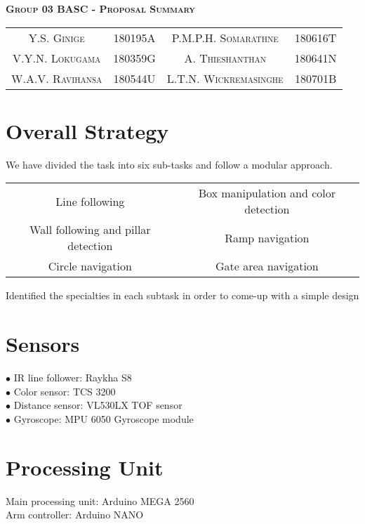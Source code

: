 \documentclass[a4paper, 12pt]{article}
\begin{document}
\begin{center}
     \textbf{\textsc{\Large {Group 03 BASC - Proposal Summary\\}}}
\end{center}

\begin{center}
\begin{tabular}{c c c c}
     \textsc{Y.S. Ginige} & 180195A &  \textsc{P.M.P.H. Somarathne} & 180616T\\
     \textsc{V.Y.N. Lokugama }& 180359G & \textsc{A. Thieshanthan} &  180641N\\
       \textsc{W.A.V. Ravihansa} &  180544U &  \textsc{L.T.N. Wickremasinghe} & 180701B
\end{tabular}
\end{center}
\section{Overall Strategy}
We have divided the task into six sub-tasks and follow a modular approach.\\
\begin{tabular}{c c}
Line following & Box manipulation and color detection\\
Wall following and pillar detection & Ramp navigation\\
Circle navigation & Gate area navigation\\
\end{tabular}
Identified the specialties in each subtask in order to come-up with a simple design\\

\section{Sensors}
$ \bullet $ IR line follower: Raykha S8\\
$ \bullet $ Color sensor: TCS 3200\\
$ \bullet $ Distance sensor: VL530LX TOF sensor\\
$ \bullet $ Gyroscope: MPU 6050 Gyroscope module\\

\section{Processing Unit}
Main processing unit: Arduino MEGA 2560\\
Arm controller: Arduino NANO\\
\end{document}
